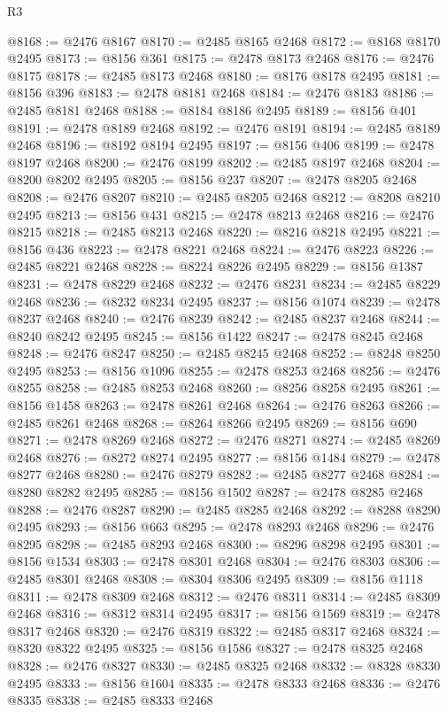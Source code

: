 \begin{lexlean}{R3}
\begin{coremodule}
@8168 := @2476 @8167
@8170 := @2485 @8165 @2468
@8172 := @8168 @8170 @2495
@8173 := @8156 @361
@8175 := @2478 @8173 @2468
@8176 := @2476 @8175
@8178 := @2485 @8173 @2468
@8180 := @8176 @8178 @2495
@8181 := @8156 @396
@8183 := @2478 @8181 @2468
@8184 := @2476 @8183
@8186 := @2485 @8181 @2468
@8188 := @8184 @8186 @2495
@8189 := @8156 @401
@8191 := @2478 @8189 @2468
@8192 := @2476 @8191
@8194 := @2485 @8189 @2468
@8196 := @8192 @8194 @2495
@8197 := @8156 @406
@8199 := @2478 @8197 @2468
@8200 := @2476 @8199
@8202 := @2485 @8197 @2468
@8204 := @8200 @8202 @2495
@8205 := @8156 @237
@8207 := @2478 @8205 @2468
@8208 := @2476 @8207
@8210 := @2485 @8205 @2468
@8212 := @8208 @8210 @2495
@8213 := @8156 @431
@8215 := @2478 @8213 @2468
@8216 := @2476 @8215
@8218 := @2485 @8213 @2468
@8220 := @8216 @8218 @2495
@8221 := @8156 @436
@8223 := @2478 @8221 @2468
@8224 := @2476 @8223
@8226 := @2485 @8221 @2468
@8228 := @8224 @8226 @2495
@8229 := @8156 @1387
@8231 := @2478 @8229 @2468
@8232 := @2476 @8231
@8234 := @2485 @8229 @2468
@8236 := @8232 @8234 @2495
@8237 := @8156 @1074
@8239 := @2478 @8237 @2468
@8240 := @2476 @8239
@8242 := @2485 @8237 @2468
@8244 := @8240 @8242 @2495
@8245 := @8156 @1422
@8247 := @2478 @8245 @2468
@8248 := @2476 @8247
@8250 := @2485 @8245 @2468
@8252 := @8248 @8250 @2495
@8253 := @8156 @1096
@8255 := @2478 @8253 @2468
@8256 := @2476 @8255
@8258 := @2485 @8253 @2468
@8260 := @8256 @8258 @2495
@8261 := @8156 @1458
@8263 := @2478 @8261 @2468
@8264 := @2476 @8263
@8266 := @2485 @8261 @2468
@8268 := @8264 @8266 @2495
@8269 := @8156 @690
@8271 := @2478 @8269 @2468
@8272 := @2476 @8271
@8274 := @2485 @8269 @2468
@8276 := @8272 @8274 @2495
@8277 := @8156 @1484
@8279 := @2478 @8277 @2468
@8280 := @2476 @8279
@8282 := @2485 @8277 @2468
@8284 := @8280 @8282 @2495
@8285 := @8156 @1502
@8287 := @2478 @8285 @2468
@8288 := @2476 @8287
@8290 := @2485 @8285 @2468
@8292 := @8288 @8290 @2495
@8293 := @8156 @663
@8295 := @2478 @8293 @2468
@8296 := @2476 @8295
@8298 := @2485 @8293 @2468
@8300 := @8296 @8298 @2495
@8301 := @8156 @1534
@8303 := @2478 @8301 @2468
@8304 := @2476 @8303
@8306 := @2485 @8301 @2468
@8308 := @8304 @8306 @2495
@8309 := @8156 @1118
@8311 := @2478 @8309 @2468
@8312 := @2476 @8311
@8314 := @2485 @8309 @2468
@8316 := @8312 @8314 @2495
@8317 := @8156 @1569
@8319 := @2478 @8317 @2468
@8320 := @2476 @8319
@8322 := @2485 @8317 @2468
@8324 := @8320 @8322 @2495
@8325 := @8156 @1586
@8327 := @2478 @8325 @2468
@8328 := @2476 @8327
@8330 := @2485 @8325 @2468
@8332 := @8328 @8330 @2495
@8333 := @8156 @1604
@8335 := @2478 @8333 @2468
@8336 := @2476 @8335
@8338 := @2485 @8333 @2468

\end{coremodule}
\end{lexlean}
